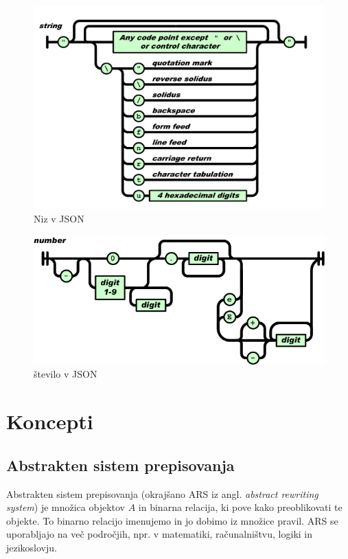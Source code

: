 \documentclass[12pt,titlepage]{report}
\newcommand{\angokr}[2]{(okrajšano #1 iz angl. \emph{#2})}
\begin{document}
			\begin{figure}[H]
				\centering
				\includegraphics[width=\textwidth]{json_string.png}
				\caption{Niz v JSON\cite{ecma404}}
				\label{fig:json_str}
			\end{figure}
			\begin{figure}[H]
				\centering
				\includegraphics[width=\textwidth]{json_number.png}
				\caption{število v JSON\cite{ecma404}}
				\label{fig:json_num}
			\end{figure}
	\section{Koncepti} %
		\subsection{Abstrakten sistem prepisovanja}
			Abstrakten sistem prepisovanja \angokr{ARS}{abstract rewriting system} je množica objektov $A$ in binarna relacija, ki pove kako preoblikovati te objekte.
			To binarno relacijo imenujemo  \cite[chapter, p.~7]{terese} in jo dobimo iz množice pravil.
			ARS se uporabljajo na več področjih, npr. v matematiki, računalništvu, logiki in jezikoslovju.
\end{document}
